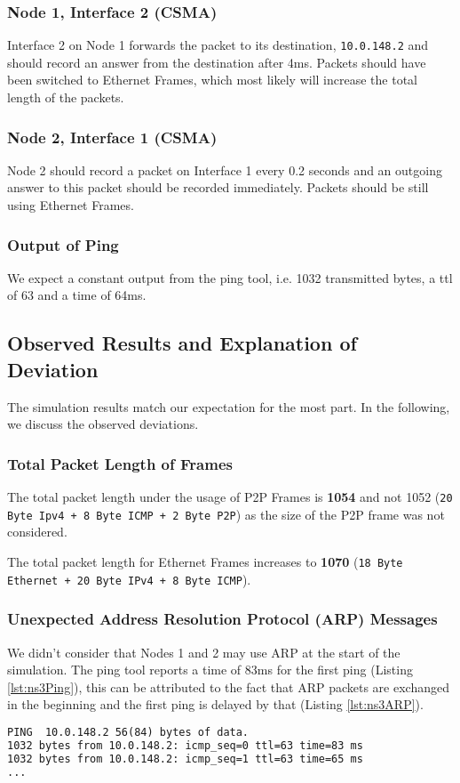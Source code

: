 \documentclass[parskip=full]{scrartcl}
\begin{document}
\subsubsection{Node 1, Interface 2 (CSMA)}
Interface 2 on Node 1 forwards the packet to its destination, \texttt{10.0.148.2} and should record an answer from the destination after 4ms.
Packets should have been switched to Ethernet Frames, which most likely will increase the total length of the packets.
\subsubsection{Node 2, Interface 1 (CSMA)}
Node 2 should record a packet on Interface 1 every 0.2 seconds and an outgoing answer to this packet should be recorded immediately.
Packets should be still using Ethernet Frames.

\subsubsection{Output of Ping}
We expect a constant output from the ping tool, i.e. 1032 transmitted bytes, a ttl of 63 and a time of 64ms.

\subsection{Observed Results and Explanation of Deviation}
The simulation results match our expectation for the most part. 
In the following, we discuss the observed deviations.

\subsubsection{Total Packet Length of Frames}
The total packet length under the usage of P2P Frames is \textbf{1054} and not 1052 (\texttt{20 Byte Ipv4 + 8 Byte ICMP + 2 Byte P2P}) as the size of the P2P frame was not considered.

The total packet length for Ethernet Frames increases to \textbf{1070} (\texttt{18 Byte Ethernet + 20 Byte IPv4 + 8 Byte ICMP}).

\subsubsection{Unexpected Address Resolution Protocol (ARP) Messages}
We didn't consider that Nodes 1 and 2 may use ARP at the start of the simulation.
The ping tool reports a time of 83ms for the first ping (Listing \ref{lst:ns3Ping}), this can be attributed to the fact that ARP packets are exchanged in the beginning and the first ping is delayed by that (Listing \ref{lst:ns3ARP}). 
\begin{lstlisting}[language=tex, breaklines, frame=single, caption={Ping output from the ns3 simulation}, label=lst:ns3Ping, float, floatplacement=h]
PING  10.0.148.2 56(84) bytes of data.
1032 bytes from 10.0.148.2: icmp_seq=0 ttl=63 time=83 ms
1032 bytes from 10.0.148.2: icmp_seq=1 ttl=63 time=65 ms
...
\end{lstlisting}
\end{document}
